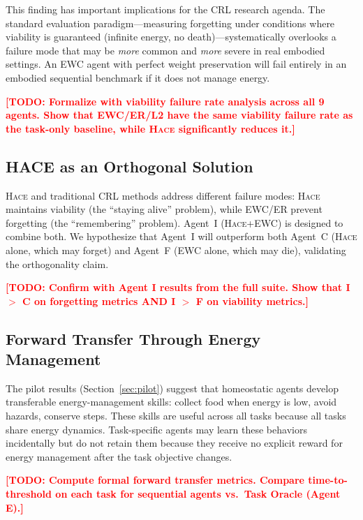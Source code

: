 \documentclass{article}
\newcommand{\todo}[1]{\textcolor{red}{\textbf{[TODO: #1]}}}
\newcommand{\hace}{\textsc{Hace}}
\begin{document}
This finding has important implications for the CRL research agenda.
The standard evaluation paradigm---measuring forgetting under conditions
where viability is guaranteed (infinite energy, no death)---systematically
overlooks a failure mode that may be \emph{more} common and \emph{more}
severe in real embodied settings. An EWC agent with perfect weight
preservation will fail entirely in an embodied sequential benchmark if
it does not manage energy.

\todo{Formalize with viability failure rate analysis across all 9 agents.
Show that EWC/ER/L2 have the same viability failure rate as the task-only
baseline, while \hace{} significantly reduces it.}

\subsection{HACE as an Orthogonal Solution}

\hace{} and traditional CRL methods address different failure modes:
\hace{} maintains viability (the ``staying alive'' problem), while
EWC/ER prevent forgetting (the ``remembering'' problem). Agent~I
(\hace{}+EWC) is designed to combine both. We hypothesize that Agent~I
will outperform both Agent~C (\hace{} alone, which may forget) and
Agent~F (EWC alone, which may die), validating the orthogonality claim.

\todo{Confirm with Agent I results from the full suite. Show that
I $>$ C on forgetting metrics AND I $>$ F on viability metrics.}

\subsection{Forward Transfer Through Energy Management}

The pilot results (Section~\ref{sec:pilot}) suggest that homeostatic
agents develop transferable energy-management skills: collect food when
energy is low, avoid hazards, conserve steps. These skills are useful
across all tasks because all tasks share energy dynamics. Task-specific
agents may learn these behaviors incidentally but do not retain them
because they receive no explicit reward for energy management after
the task objective changes.

\todo{Compute formal forward transfer metrics. Compare time-to-threshold
on each task for sequential agents vs.\ Task Oracle (Agent E).}

\end{document}
